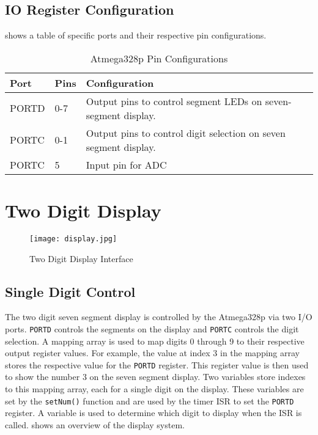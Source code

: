 \documentclass[main.tex]{subfiles}
\begin{document}
		\subsection{IO Register Configuration}
		 shows a table of specific ports and their
		respective pin configurations.

		\begin{table}[H]
			\begin{center}
				\begin{tabularx}{\textwidth}{llX} 
					Port & Pins & Configuration \\ \hline \hline
					PORTD & 0-7 & Output pins to control segment LEDs on seven-segment display. \\ \hline
					PORTC & 0-1 & Output pins to control digit selection on seven segment	display. \\ \hline
					PORTC & 5 & Input pin for ADC 
				\end{tabularx}
				\caption{Atmega328p Pin Configurations}
				\label{tab:pinConfig}
			\end{center}
		\end{table}
	
	\section{Two Digit Display}
		\begin{figure}[H]
			\begin{center}
				\texttt{[image: display.jpg]}
			\end{center}
			\caption{Two Digit Display Interface}
			\label{fig:twoDigitIfc}
		\end{figure}
		\subsection{Single Digit Control}

		The two digit seven segment display is controlled by the Atmega328p via two
		I/O ports. \lstinline{PORTD} controls the segments on the display and
		\lstinline{PORTC} controls the digit selection. A mapping array is used to
		map digits 0 through 9 to their respective output register values. For
		example, the value at index 3 in the mapping array stores the respective
		value for the \lstinline{PORTD} register. This register value is then used
		to show the number 3 on the seven segment display. Two variables store
		indexes to this mapping array, each for a single digit on the display. These
		variables are set by the \lstinline{setNum()} function and are used by the
		timer ISR to set the \lstinline{PORTD} register. A variable is used to
		determine which digit to display when the ISR is called.
		 shows an overview of the display system.
\end{document}
